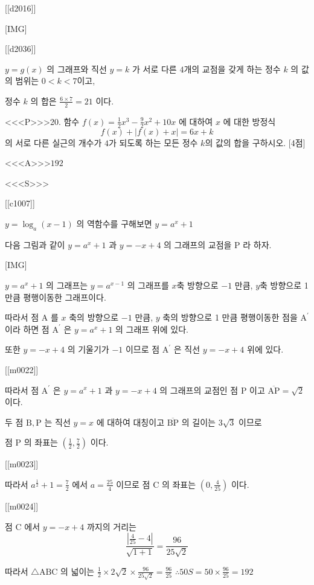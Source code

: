 \documentclass{oblivoir}
\begin{document}
[[d2016]]

[IMG]

[[d2036]]

$y=g(x)$ 의 그래프와 직선 $y=k$ 가 서로 다른 $4$개의 교점을 갖게 하는 정수 $k$ 의 값의 범위는 $0<k<7$이고,

정수 $k$ 의 합은 $\frac{6 \times 7}{2}=21$ 이다.


<<<P>>>20. 함수 $f(x)=\frac{1}{2} x^{3}-\frac{9}{2} x^{2}+10 x$ 에 대하여 $x$ 에 대한 방정식
$$
f(x)+|f(x)+x|=6 x+k
$$
의 서로 다른 실근의 개수가 $4$가 되도록 하는 모든 정수 $k$의 값의 합을 구하시오. [4점]

<<<A>>>$192$

<<<S>>>

[[c1007]]

$y=\log _{a}(x-1)$ 의 역함수를 구해보면 $y=a^{x}+1$

다음 그림과 같이 $y=a^{x}+1$ 과 $y=-x+4$ 의 그래프의 교점을 $\mathrm{P}$ 라 하자.

[IMG]

$y=a^{x}+1$ 의 그래프는 $y=a^{x-1}$ 의 그래프를 $x$축 방향으로 $-1$ 만큼, $y$축 방향으로 1 만큼 평행이동한 그래프이다.

따라서 점 $\mathrm{A}$ 를 $x$ 축의 방향으로 $-1$ 만큼, $y$ 축의 방향으로 1 만큼 평행이동한 점을 $\mathrm{A}^{\prime}$ 이라 하면 점 $\mathrm{A}^{\prime}$ 은 $y=a^{x}+1$ 의 그래프 위에 있다.

또한 $y=-x+4$ 의 기울기가 $-1$ 이므로 점 $\mathrm{A}^{\prime}$ 은 직선 $y=-x+4$ 위에 있다.

[[m0022]]

따라서 점 $\mathrm{A}^{\prime}$ 은 $y=a^{x}+1$ 과 $y=-x+4$ 의 그래프의 교점인 점 $\mathrm{P}$ 이고 $\overline{\mathrm{AP}}=\sqrt{2}$ 이다.

두 점 $\mathrm{B}, \mathrm{P}$ 는 직선 $y=x$ 에 대하여 대칭이고 $\overline{\mathrm{BP}}$ 의 길이는 $3 \sqrt{3}$ 이므로

점 $\mathrm{P}$ 의 좌표는 $\left(\frac{1}{2}, \frac{7}{2}\right)$ 이다.

[[m0023]]

따라서 $a^{\frac{1}{2}}+1=\frac{7}{2}$ 에서 $a=\frac{25}{4}$ 이므로 점 $\mathrm{C}$ 의 좌표는 $\left(0, \frac{4}{25}\right)$ 이다.

[[m0024]]

점 $\mathrm{C}$ 에서 $y=-x+4$ 까지의 거리는
$$
\frac{\left|\frac{4}{25}-4\right|}{\sqrt{1+1}}=\frac{96}{25 \sqrt{2}}
$$

따라서 $\triangle \mathrm{ABC}$ 의 넓이는 $\frac{1}{2} \times 2 \sqrt{2} \times \frac{96}{25 \sqrt{2}}=\frac{96}{25}$ $\therefore 50 S=50 \times \frac{96}{25}=192$
\end{document}

